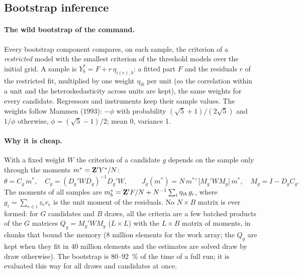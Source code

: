\subsection{Bootstrap inference}\label{note:boot}

\paragraph{The wild bootstrap of the command.} Every bootstrap component compares, on each sample, the
criterion of a \emph{restricted} model with the smallest criterion of the threshold models over the
initial grid. A sample is $Y^*_b=F+r\,\eta_{i(e),b}$: a fitted part $F$ and the residuals $r$ of the
restricted fit, multiplied by one weight $\eta_{ib}$ per unit (so the correlation within a unit and
the heteroskedasticity across units are kept), the same weights for every candidate. Regressors and
instruments keep their sample values. The weights follow Mammen (1993): $-\phi$ with probability
$(\sqrt5+1)/(2\sqrt5)$ and $1/\phi$ otherwise, $\phi=(\sqrt5-1)/2$; mean 0, variance 1.

\paragraph{Why it is cheap.} With a fixed weight $W$ the criterion of a candidate $g$ depends on the
sample only through the moments $m^*=\mathbf{Z}'Y^*/N$:
\begin{equation}\label{eq:quad}
\theta=C_g\,m^*,\quad C_g=(D_g'WD_g)^{-1}D_g'W,\qquad
J_g(m^*)=N\,{m^*}'\,\bigl[M_g'WM_g\bigr]\,m^*,\quad M_g=I-D_gC_g .
\end{equation}
The moments of all samples are $m^*_b=\mathbf{Z}'F/N+N^{-1}\sum_i\eta_{ib}\,g_i$, where $g_i=\sum_{e\in i}z_er_e$
is the unit moment of the residuals. No $N\times B$ matrix is ever formed: for $G$ candidates and $B$
draws, all the criteria are a few batched products of the $G$ matrices
$Q_g=M_g'WM_g$ ($L\times L$) with the $L\times B$ matrix of moments, in chunks that bound the memory
(8 million elements for the work array; the $Q_g$ are kept when they fit in 40 million elements and
the estimates are solved draw by draw otherwise). The bootstrap is 80--92~\% of the time of a full
run; it is evaluated this way for all draws and candidates at once.

